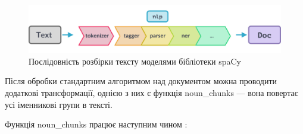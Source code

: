 \documentclass[14pt]{extarticle}
\begin{document}
  \begin{figure}[H]
    \centering
    \includegraphics[width=\textwidth]{spacy_pipeline.png}    
    \caption{Послідовність розбірки тексту моделями бібліотеки spaCy}
    \label{fig:spacy_pipeline}
  \end{figure}

  Після обробки стандартним алгоритмом над документом можна проводити додаткові
  трансформації, однією з них є функція noun\_chunks
  \cite{spacy_noun_chunks} ---
  вона повертає усі іменникові групи \cite{wiki_noun_phrase} в тексті.

  Функція noun\_chunks працює наступним чином \cite{wiki_noun_chunks_impl}:
\end{document}
